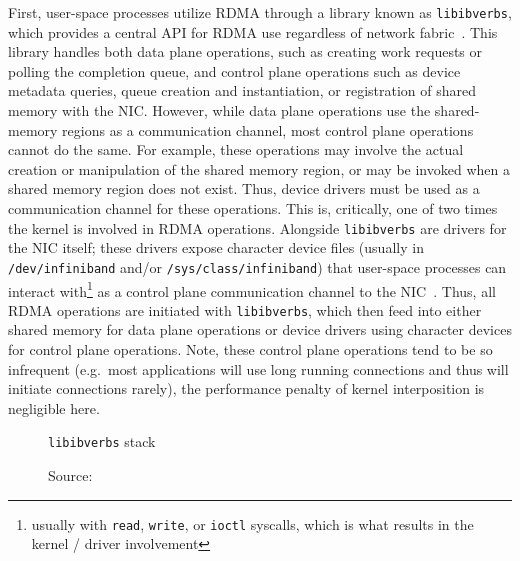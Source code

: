 \documentclass[12pt,titlepage]{article}
\begin{document}
First, user-space processes utilize RDMA through a library known as \texttt{libibverbs}, which provides a central API for RDMA use regardless of network fabric~\cite{rdmacoredocumentation}.
This library handles both data plane operations, such as creating work requests or polling the completion queue, and control plane operations such as device metadata queries, queue creation and instantiation, or registration of shared memory with the NIC\@.
However, while data plane operations use the shared-memory regions as a communication channel, most control plane operations cannot do the same.
For example, these operations may involve the actual creation or manipulation of the shared memory region, or may be invoked when a shared memory region does not exist.
Thus, device drivers must be used as a communication channel for these operations.
This is, critically, one of two times the kernel is involved in RDMA operations.
Alongside \texttt{libibverbs} are drivers for the NIC itself;
these drivers expose character device files (usually in \texttt{/dev/infiniband} and/or \texttt{/sys/class/infiniband}) that user-space processes can interact with\footnote{usually with \texttt{read}, \texttt{write}, or \texttt{ioctl} syscalls, which is what results in the kernel / driver involvement} as a control plane communication channel to the NIC~\cite{linuxkernellibibverbs}.
Thus, all RDMA operations are initiated with \texttt{libibverbs}, which then feed into either shared memory for data plane operations or device drivers using character devices for control plane operations.
Note, these control plane operations tend to be so infrequent (e.g.\ most applications will use long running connections and thus will initiate connections rarely), the performance penalty of kernel interposition is negligible here.

\begin{figure}
   \centering
   \caption{\texttt{libibverbs} stack}
   \caption*{Source:~\cite{mlnxofedmanual}}
\end{figure}
\end{document}
